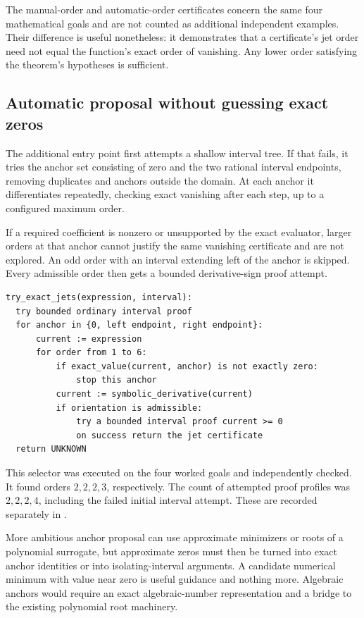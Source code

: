 The manual-order and automatic-order certificates concern the same four mathematical goals and are not counted as additional independent examples. Their difference is useful nonetheless: it demonstrates that a certificate's jet order need not equal the function's exact order of vanishing. Any lower order satisfying the theorem's hypotheses is sufficient.

\subsection{Automatic proposal without guessing exact zeros}
The additional  entry point first attempts a shallow interval tree. If that fails, it tries the anchor set consisting of zero and the two rational interval endpoints, removing duplicates and anchors outside the domain. At each anchor it differentiates repeatedly, checking exact vanishing after each step, up to a configured maximum order.

If a required coefficient is nonzero or unsupported by the exact evaluator, larger orders at that anchor cannot justify the same vanishing certificate and are not explored. An odd order with an interval extending left of the anchor is skipped. Every admissible order then gets a bounded derivative-sign proof attempt.

\par\noindent\begin{minipage}{\linewidth}
\begin{lstlisting}
try_exact_jets(expression, interval):
  try bounded ordinary interval proof
  for anchor in {0, left endpoint, right endpoint}:
      current := expression
      for order from 1 to 6:
          if exact_value(current, anchor) is not exactly zero:
              stop this anchor
          current := symbolic_derivative(current)
          if orientation is admissible:
              try a bounded interval proof current >= 0
              on success return the jet certificate
  return UNKNOWN
\end{lstlisting}
\end{minipage}\par

This selector was executed on the four worked goals and independently checked. It found orders \(2,2,2,3\), respectively. The count of attempted proof profiles was \(2,2,2,4\), including the failed initial interval attempt. These are recorded separately in .

More ambitious anchor proposal can use approximate minimizers or roots of a polynomial surrogate, but approximate zeros must then be turned into exact anchor identities or into isolating-interval arguments. A candidate numerical minimum with value near zero is useful guidance and nothing more. Algebraic anchors would require an exact algebraic-number representation and a bridge to the existing polynomial root machinery.

